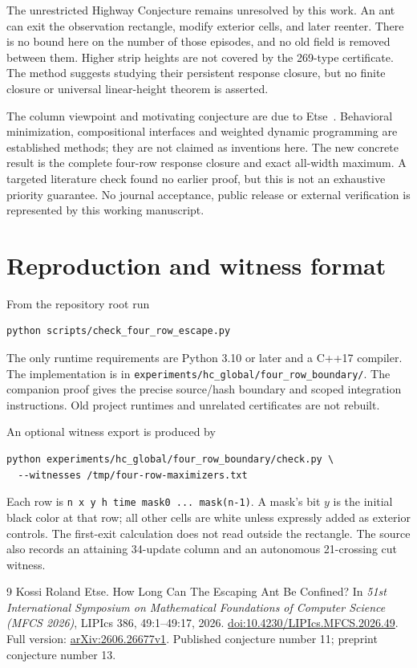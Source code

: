 \documentclass[11pt]{article}
\theoremstyle{definition}\newtheorem{definition}[theorem]{Definition}
\begin{document}
The unrestricted Highway Conjecture remains unresolved by this work. An ant
can exit the observation rectangle, modify exterior cells, and later reenter.
There is no bound here on the number of those episodes, and no old field is
removed between them. Higher strip heights are not covered by the 269-type
certificate. The method suggests studying their persistent response closure,
but no finite closure or universal linear-height theorem is asserted.

The column viewpoint and motivating conjecture are due to Etse~\cite{etse}.
Behavioral minimization, compositional interfaces and weighted dynamic
programming are established methods; they are not claimed as inventions here.
The new concrete result is the complete four-row response closure and exact
all-width maximum. A targeted literature check found no earlier proof, but
this is not an exhaustive priority guarantee. No journal acceptance, public
release or external verification is represented by this working manuscript.

\appendix
\section{Reproduction and witness format}
From the repository root run
\begin{Verbatim}[fontsize=\small]
python scripts/check_four_row_escape.py
\end{Verbatim}
The only runtime requirements are Python 3.10 or later and a C++17 compiler.
The implementation is in
\texttt{experiments/hc\_global/four\_row\_boundary/}.
The companion proof gives the precise source/hash boundary and scoped
integration instructions. Old project runtimes and unrelated certificates
are not rebuilt.

An optional witness export is produced by
\begin{Verbatim}[fontsize=\small]
python experiments/hc_global/four_row_boundary/check.py \
  --witnesses /tmp/four-row-maximizers.txt
\end{Verbatim}
Each row is \texttt{n x y h time mask0 ... mask(n-1)}. A mask's bit $y$ is the
initial black color at that row; all other cells are white unless expressly
added as exterior controls. The first-exit calculation does not read outside
the rectangle. The source also records an attaining 34-update column and an
autonomous 21-crossing cut witness.

\begin{thebibliography}{9}
Kossi Roland Etse.
\newblock How Long Can The Escaping Ant Be Confined?
\newblock In \emph{51st International Symposium on Mathematical Foundations of
Computer Science (MFCS 2026)}, LIPIcs 386, 49:1--49:17, 2026.
\newblock \href{https://doi.org/10.4230/LIPIcs.MFCS.2026.49}{doi:10.4230/LIPIcs.MFCS.2026.49}.
\newblock Full version: \href{https://arxiv.org/abs/2606.26677}{arXiv:2606.26677v1}.
Published conjecture number 11; preprint conjecture number 13.
\end{thebibliography}
\end{document}
